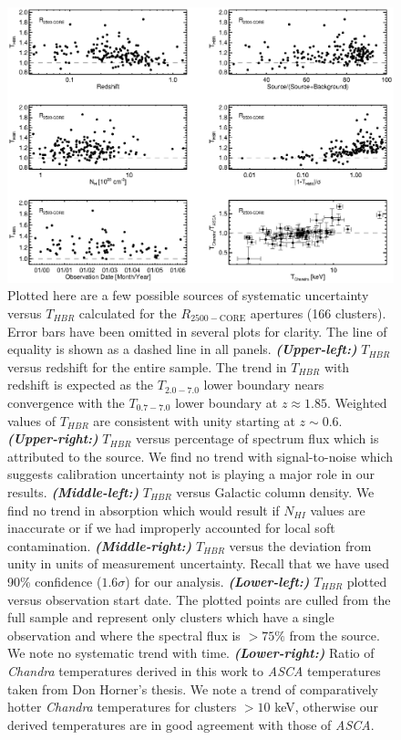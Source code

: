 \documentclass[12pt,preprint]{aastex}
\begin{document}
\clearpage
\begin{figure}
\begin{center}
\includegraphics*[width=\textwidth, trim=0mm 0mm 0mm 0mm, clip]{f4.eps}
\caption{
Plotted here are a few possible sources of systematic uncertainty
versus $T_{HBR}$ calculated for the $R_{2500-\mathrm{CORE}}$
apertures (166 clusters). Error bars have been omitted in several
plots for clarity. The line of equality is shown as a dashed line in
all panels.
{\bfseries\em{(Upper-left:)}} $T_{HBR}$ versus redshift for the
entire sample. The trend in $T_{HBR}$ with redshift is expected as the
$T_{2.0-7.0}$ lower boundary nears convergence with the $T_{0.7-7.0}$
lower boundary at $z \approx 1.85$. Weighted values of $T_{HBR}$ are
consistent with unity starting at $z \sim
0.6$.
{\bfseries\em{(Upper-right:)}} $T_{HBR}$ versus percentage of
spectrum flux which is attributed to the source. We find no trend with
signal-to-noise which suggests calibration uncertainty not is playing
a major role in our results.
{\bfseries\em{(Middle-left:)}} $T_{HBR}$
versus Galactic column density. We find no trend in absorption which
would result if $N_{HI}$ values are inaccurate or if we had improperly
accounted for local soft
contamination.
{\bfseries\em{(Middle-right:)}} $T_{HBR}$ versus the
deviation from unity in units of measurement uncertainty. Recall that
we have used 90\% confidence ($1.6\sigma$) for our analysis.
{\bfseries\em{(Lower-left:)}} $T_{HBR}$ plotted versus
observation start date. The plotted points are culled from the full
sample and represent only clusters which have a single observation and
where the spectral flux is $> 75\%$ from the source. We note no
systematic trend with time.
{\bfseries\em{(Lower-right:)}} Ratio of {\it Chandra}
temperatures derived in this work to {\it ASCA} temperatures taken
from Don Horner's thesis. We note a trend of comparatively hotter {\it
Chandra} temperatures for clusters $> 10$ keV, otherwise our derived
temperatures are in good agreement with those of {\it ASCA}.
}
\label{fig:sysr25}
\end{center}
\end{figure}
\clearpage
\end{document}
